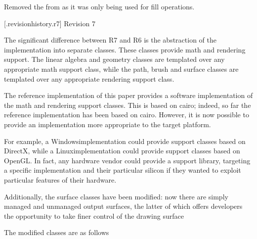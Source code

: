 \pnum
Removed the  from  as it was only being used for fill operations.

 [\iotwod.revisionhistory.r7] {Revision 7}

\pnum
The significant difference between R7 and R6 is the abstraction of the implementation into separate classes. These classes provide math and rendering support. The linear algebra and geometry classes are templated over any appropriate math support class, while the path, brush and surface classes are templated over any appropriate rendering support class.

\pnum
The reference implementation of this paper provides a software implementation of the math and rendering support classes. This is based on cairo; indeed, so far the reference implementation has been based on cairo. However, it is now possible to provide an implementation more appropriate to the target platform.

\pnum
For example, a Windows\textregistered implementation could provide support classes based on DirectX\textregistered, while a Linux\textregistered implementation could provide support classes based on OpenGL\textregistered. In fact, any hardware vendor could provide a support library, targeting a specific implementation and their particular silicon if they wanted to exploit particular features of their hardware.

\pnum
Additionally, the surface classes have been modified: now there are simply managed and unmanaged output surfaces, the latter of which offers developers the opportunity to take finer control of the drawing surface

\pnum
The modified classes are as follows

